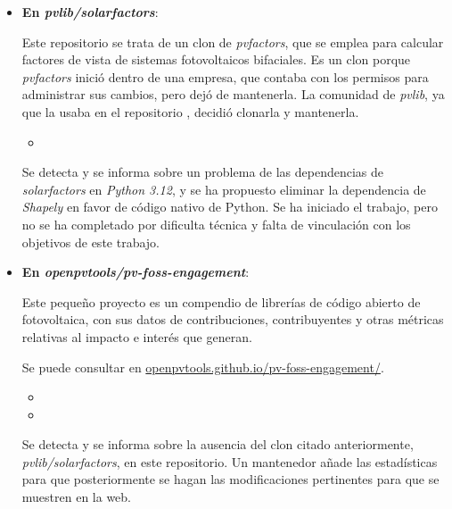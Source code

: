 \begin{itemize}

    \item \textbf{En \textit{pvlib/solarfactors}}:

          Este \gls{repositorio} se trata de un clon de \textit{pvfactors}, que se emplea para calcular factores de vista de sistemas fotovoltaicos bifaciales. Es un clon porque \textit{pvfactors} inició dentro de una empresa, que contaba con los permisos para administrar sus cambios, pero dejó de mantenerla. La comunidad de \textit{pvlib}, ya que la usaba en el repositorio \pvlibpy{}, decidió clonarla y mantenerla.

          \begin{itemize}
              \item {}
          \end{itemize}

          Se detecta y se informa sobre un problema de las dependencias de \textit{solarfactors} en \textit{Python 3.12}, y se ha propuesto eliminar la dependencia de \textit{Shapely} en favor de código nativo de Python. Se ha iniciado el trabajo, pero no se ha completado por dificulta técnica y falta de vinculación con los objetivos de este trabajo.

    \item \textbf{En \textit{openpvtools/pv-foss-engagement}}:

          Este pequeño proyecto es un compendio de librerías de código abierto de fotovoltaica, con sus datos de contribuciones, contribuyentes y otras métricas relativas al impacto e interés que generan.

          Se puede consultar en \href{https://openpvtools.github.io/pv-foss-engagement/}{openpvtools.github.io/pv-foss-engagement/}.

          \begin{itemize}
              \item {}
              \item {}
          \end{itemize}

          Se detecta y se informa sobre la ausencia del clon citado anteriormente, \textit{pvlib/solarfactors}, en este \gls{repositorio}. Un mantenedor añade las estadísticas para que posteriormente se hagan las modificaciones pertinentes para que se muestren en la web.


\end{itemize}
